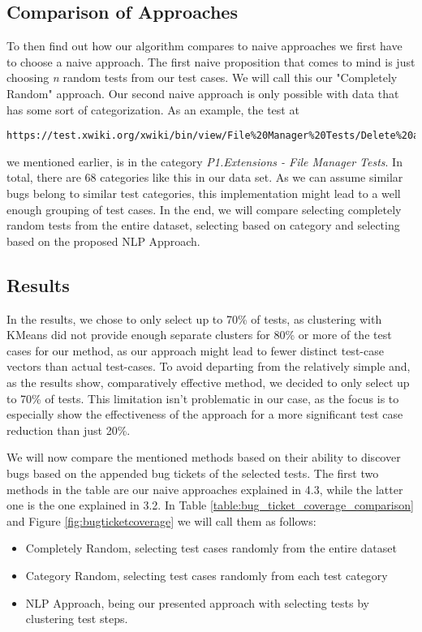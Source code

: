 \subsection{Comparison of Approaches}
To then find out how our algorithm compares to naive approaches we first have
to choose a naive approach. The first naive proposition that comes to mind is just
choosing \emph{n} random tests from our test cases. We will call this our "Completely Random" approach. Our second naive approach is only
possible with data that has some sort of categorization. As an example, the
test at
\begin{verbatim}
https://test.xwiki.org/xwiki/bin/view/File%20Manager%20Tests/Delete%20a%20file
\end{verbatim}
we mentioned earlier, is in the category \emph{P1.Extensions - File Manager
    Tests}. In total, there are 68 categories like this in our data set. As we can
assume similar bugs belong to similar test categories, this implementation
might lead to a well enough grouping of test cases.
In the end, we will compare selecting completely random tests from the entire dataset, selecting based on category and selecting based on the proposed NLP Approach.

\subsection{Results}

In the results, we chose to only select up to 70\% of tests, as clustering with KMeans did not provide enough separate clusters for 80\% or more of the test cases for our method, as our approach might lead to fewer distinct test-case vectors than actual test-cases. To avoid departing from the relatively simple and, as the results show, comparatively effective method, we decided to only select up to 70\% of tests. This limitation isn't problematic in our case, as the focus is to especially show the effectiveness of the approach for a more significant test case reduction than just 20\%.

We will now compare the mentioned methods based on their ability to discover bugs based on the appended bug tickets of the selected tests.
The first two methods in the table are our naive approaches explained in 4.3, while the latter one is the one explained in 3.2. In Table \ref{table:bug_ticket_coverage_comparison} and Figure \ref{fig:bugticketcoverage} we will call them as follows:
\begin{itemize}
    \item Completely Random, selecting test cases randomly from the entire dataset
    \item Category Random, selecting test cases randomly from each test category
    \item NLP Approach, being our presented approach with selecting tests by clustering test
          steps.
\end{itemize}

